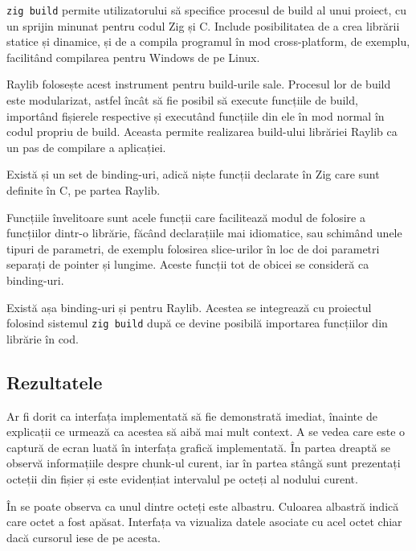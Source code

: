 \documentclass[a4paper,12pt]{report}
\begin{document}
\texttt{zig build} permite utilizatorului să specifice procesul de build al unui proiect,
cu un sprijin minunat pentru codul Zig și C.
Include posibilitatea de a crea librării statice și dinamice, și de a compila programul în mod cross-platform,
de exemplu, facilitând compilarea pentru Windows de pe Linux.

Raylib folosește acest instrument pentru build-urile sale.
Procesul lor de build este modularizat, astfel încât să fie posibil să execute funcțiile de build,
importând fișierele respective și executând funcțiile din ele în mod normal în codul propriu de build.
Aceasta permite realizarea build-ului librăriei Raylib ca un pas de compilare a aplicației.

Există și un set de binding-uri, adică niște funcții declarate în Zig care sunt definite în C, pe partea Raylib.

Funcțiile învelitoare sunt acele funcții care facilitează modul de folosire a funcțiilor dintr-o librărie,
făcând declarațiile mai idiomatice, sau schimând unele tipuri de parametri,
de exemplu folosirea slice-urilor în loc de doi parametri separați de pointer și lungime.
Aceste funcții tot de obicei se consideră ca binding-uri.

Există așa binding-uri și pentru Raylib\cite{raylib_zig}.
Acestea se integrează cu proiectul folosind sistemul \texttt{zig build}
după ce devine posibilă importarea funcțiilor din librărie în cod.

\subsection{Rezultatele}

Ar fi dorit ca interfața implementată să fie demonstrată imediat,
înainte de explicații ce urmează ca acestea să aibă mai mult context.
A se vedea  care este o captură de ecran luată în interfața grafică implementată.
În partea dreaptă se observă informațiile despre chunk-ul curent,
iar în partea stângă sunt prezentați octeții din fișier
și este evidențiat intervalul pe octeți al nodului curent.


În  se poate observa ca unul dintre octeți este albastru.
Culoarea albastră indică care octet a fost apăsat.
Interfața va vizualiza datele asociate cu acel octet chiar dacă cursorul iese de pe acesta.

\end{document}
